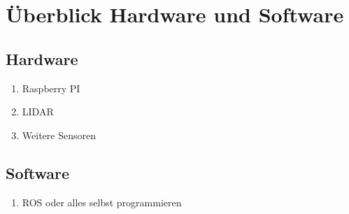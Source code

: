\section{Überblick Hardware und Software}

\subsection{Hardware}
\begin{enumerate}
    \item Raspberry PI
    \item LIDAR
    \item Weitere Sensoren
\end{enumerate}

\subsection{Software}
\begin{enumerate}
    \item ROS oder alles selbst programmieren
\end{enumerate}

\newpage

